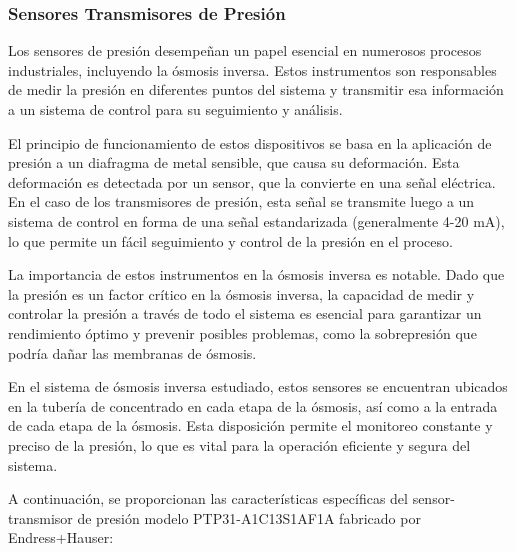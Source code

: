 \subsubsection{Sensores Transmisores de Presión} \label{sec:sensor_presion}

Los sensores de presión desempeñan un papel esencial en numerosos procesos industriales,
incluyendo la ósmosis inversa. Estos instrumentos son responsables de medir la presión en diferentes puntos
del sistema y transmitir esa información a un sistema de control para su seguimiento y análisis.

El principio de funcionamiento de estos dispositivos se basa en la aplicación de presión a un diafragma de
metal sensible, que causa su deformación. Esta deformación es detectada por un sensor, que la convierte en
una señal eléctrica. En el caso de los transmisores de presión, esta señal se transmite luego a un sistema de control en forma
de una señal estandarizada (generalmente 4-20 mA), lo que permite un fácil seguimiento y control de la presión en el proceso.

La importancia de estos instrumentos en la ósmosis inversa es notable. Dado que la presión es un factor
crítico en la ósmosis inversa, la capacidad de medir y controlar la presión a través de todo el sistema
es esencial para garantizar un rendimiento óptimo y prevenir posibles problemas, como la sobrepresión
que podría dañar las membranas de ósmosis.

En el sistema de ósmosis inversa estudiado, estos sensores se encuentran
ubicados en la tubería de concentrado en cada etapa de la ósmosis, así como a la entrada de cada etapa
de la ósmosis. Esta disposición permite el monitoreo constante y preciso de la presión, lo que es
vital para la operación eficiente y segura del sistema.

A continuación, se proporcionan las características específicas del sensor-transmisor de presión
modelo PTP31-A1C13S1AF1A fabricado por Endress+Hauser:\\



